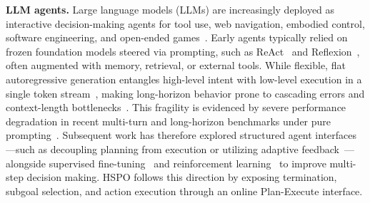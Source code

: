 \documentclass{article}
\newcommand{\wei}[1]{\textcolor{red}{#1}}
\begin{document}
\textbf{LLM agents.}
Large language models (LLMs) are increasingly deployed as interactive decision-making agents for tool use, web navigation, embodied control, software engineering, and open-ended games~\cite{yao2022react,shinn2023reflexion,wang2024voyager}. Early agents typically relied on frozen foundation models steered via prompting, such as ReAct~\cite{yao2022react} and Reflexion~\cite{shinn2023reflexion}, often augmented with memory, retrieval, or external tools. While flexible, flat autoregressive generation entangles high-level intent with low-level execution in a single token stream~\cite{NEURIPS2023_271db992}, making long-horizon behavior prone to cascading errors and context-length bottlenecks~\cite{packer2024memgptllmsoperatingsystems}. This fragility is evidenced by severe performance degradation in recent multi-turn and long-horizon benchmarks under pure prompting~\cite{ma2024agentboard,ICLR2024_e9df36b2,pmlr-v235-xie24j}. Subsequent work has therefore explored structured agent interfaces—such as decoupling planning from execution or utilizing adaptive feedback~\cite{NEURIPS2023_4b0eea69,NEURIPS2023_b5c8c1c1}—alongside supervised fine-tuning~\cite{lightman2023let,wang2026subgoal} and reinforcement learning~\cite{schulman2017proximal,NEURIPS2025_420c9f77,ji2026tree} to improve multi-step decision making. HSPO follows this direction by exposing termination, subgoal selection, and action execution through an online Plan-Execute interface.

\end{document}
